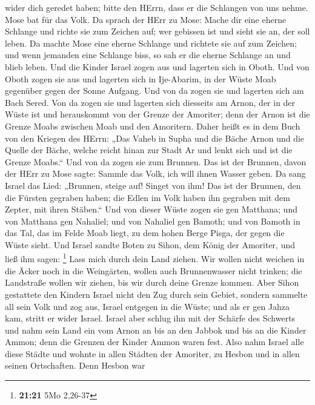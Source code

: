 wider dich geredet haben; bitte den HErrn, dass er die Schlangen von uns
nehme. Mose bat für das Volk.  Da sprach der HErr zu Mose:
Mache dir eine eherne Schlange und richte sie zum Zeichen auf; wer
gebissen ist und sieht sie an, der soll leben.  Da machte
Mose eine eherne Schlange und richtete sie auf zum Zeichen; und wenn
jemanden eine Schlange biss, so sah er die eherne Schlange an und blieb
leben.  Und die Kinder Israel zogen aus und lagerten sich
in Oboth.  Und von Oboth zogen sie aus und lagerten sich in
Ije-Abarim, in der Wüste Moab gegenüber gegen der Sonne Aufgang.
 Und von da zogen sie und lagerten sich am Bach Sered.
 Von da zogen sie und lagerten sich diesseits am Arnon, der
in der Wüste ist und herauskommt von der Grenze der Amoriter; denn der
Arnon ist die Grenze Moabs zwischen Moab und den Amoritern.
 Daher heißt es in dem Buch von den Kriegen des HErrn: „Das
Vaheb in Supha und die Bäche Arnon  und die Quelle der
Bäche, welche reicht hinan zur Stadt Ar und lenkt sich und ist die
Grenze Moabs.``  Und von da zogen sie zum Brunnen. Das ist
der Brunnen, davon der HErr zu Mose sagte: Sammle das Volk, ich will
ihnen Wasser geben.  Da sang Israel das Lied: „Brunnen,
steige auf! Singet von ihm!  Das ist der Brunnen, den die
Fürsten gegraben haben; die Edlen im Volk haben ihn gegraben mit dem
Zepter, mit ihren Stäben.`` Und von dieser Wüste zogen sie gen Matthana;
 und von Matthana gen Nahaliel; und von Nahaliel gen
Bamoth;  und von Bamoth in das Tal, das im Felde Moab
liegt, zu dem hohen Berge Pisga, der gegen die Wüste sieht.
 Und Israel sandte Boten zu Sihon, dem König der Amoriter,
und ließ ihm sagen: \footnote{\textbf{21:21} 5Mo 2,26-37} 
Lass mich durch dein Land ziehen. Wir wollen nicht weichen in die Äcker
noch in die Weingärten, wollen auch Brunnenwasser nicht trinken; die
Landstraße wollen wir ziehen, bis wir durch deine Grenze kommen.
 Aber Sihon gestattete den Kindern Israel nicht den Zug
durch sein Gebiet, sondern sammelte all sein Volk und zog aus, Israel
entgegen in die Wüste; und als er gen Jahza kam, stritt er wider Israel.
 Israel aber schlug ihn mit der Schärfe des Schwerts und
nahm sein Land ein vom Arnon an bis an den Jabbok und bis an die Kinder
Ammon; denn die Grenzen der Kinder Ammon waren fest.  Also
nahm Israel alle diese Städte und wohnte in allen Städten der Amoriter,
zu Hesbon und in allen seinen Ortschaften.  Denn Hesbon war
